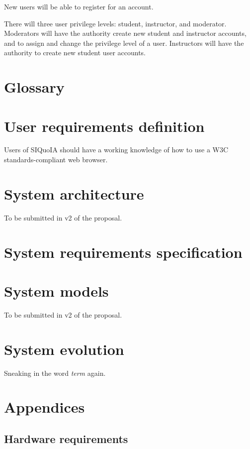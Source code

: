 \documentclass[12pt]{article}
\begin{document}
New users will be able to register for an account.

There will three user privilege levels: student, instructor, and
moderator. Moderators will have the authority create new student and
instructor accounts, and to assign and change the privilege level of a
user. Instructors will have the authority to create new student user
accounts.

\section{Glossary}
\printglossaries

\section{User requirements definition}
Users of SIQuoIA should have a working knowledge of how to use a
\gls{W3C} standards-compliant web browser.

\section{System architecture}
To be submitted in v2 of the proposal.

\section{System requirements specification}

\section{System models}
To be submitted in v2 of the proposal.

\section{System evolution}
Sneaking in the word {\it \gls{term}} again.

\section{Appendices}

\subsection{Hardware requirements}

\printindex




\end{document}
